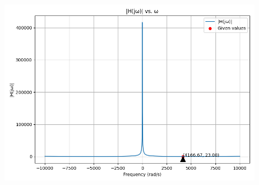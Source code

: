 \documentclass[journal,12pt,twocolumn]{IEEEtran}
\theoremstyle{remark}
\begin{document}
\begin{figure}[h!]
  \centering
  \includegraphics[width=\columnwidth]{figs/analog.png}
  \label{fig:bode_Plot}
\end{figure}
\end{document}
